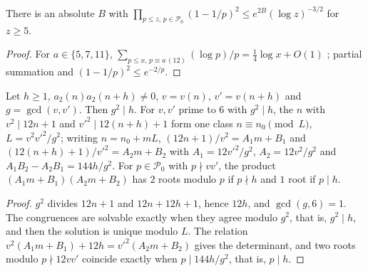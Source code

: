 \documentclass[11pt]{article}
\begin{document}
\begin{lemma}\label{lem:mertensP0}
There is an absolute $B$ with $\prod_{p\le z,\,p\in\mathcal P_0}(1-1/p)^2\le e^{2B}(\log z)^{-3/2}$ for
$z\ge5$.
\end{lemma}

\begin{proof}
For $a\in\{5,7,11\}$, $\sum_{p\le x,\,p\equiv a\,(12)}(\log p)/p=\frac14\log x+O(1)$
\cite[Thm.~7.3]{Apostol}; partial summation and $(1-1/p)^2\le e^{-2/p}$.
\end{proof}

\begin{lemma}\label{lem:pairstructure}
Let $h\ge1$, $a_2(n)a_2(n+h)\ne0$, $v=v(n)$, $v'=v(n+h)$ and $g=\gcd(v,v')$. Then $g^2\mid h$. For
$v,v'$ prime to $6$ with $g^2\mid h$, the $n$ with $v^2\mid12n+1$ and $v'^2\mid12(n+h)+1$ form one class
$n\equiv n_0\pmod L$, $L=v^2v'^2/g^2$; writing $n=n_0+mL$,
$(12n+1)/v^2=A_1m+B_1$ and $(12(n+h)+1)/v'^2=A_2m+B_2$ with $A_1=12v'^2/g^2$, $A_2=12v^2/g^2$ and
$A_1B_2-A_2B_1=144h/g^2$. For $p\in\mathcal P_0$ with $p\nmid vv'$, the product
$(A_1m+B_1)(A_2m+B_2)$ has $2$ roots modulo $p$ if $p\nmid h$ and $1$ root if $p\mid h$.
\end{lemma}

\begin{proof}
$g^2$ divides $12n+1$ and $12n+12h+1$, hence $12h$, and $\gcd(g,6)=1$. The congruences are solvable
exactly when they agree modulo $g^2$, that is, $g^2\mid h$, and then the solution is unique modulo
$L$. The relation $v^2(A_1m+B_1)+12h=v'^2(A_2m+B_2)$ gives the determinant, and two roots modulo
$p\nmid12vv'$ coincide exactly when $p\mid144h/g^2$, that is, $p\mid h$.
\end{proof}
\end{document}
